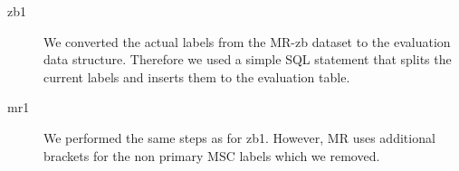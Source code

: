 \begin{description}
  \item[zb1] We converted the actual labels from the MR-zb dataset to the evaluation data structure. Therefore we used a simple SQL statement that splits the current labels and inserts them to the evaluation table.
  \item[mr1] We performed the same steps as for zb1. However, MR uses additional brackets for the non primary MSC labels which we removed.


\end{description}
